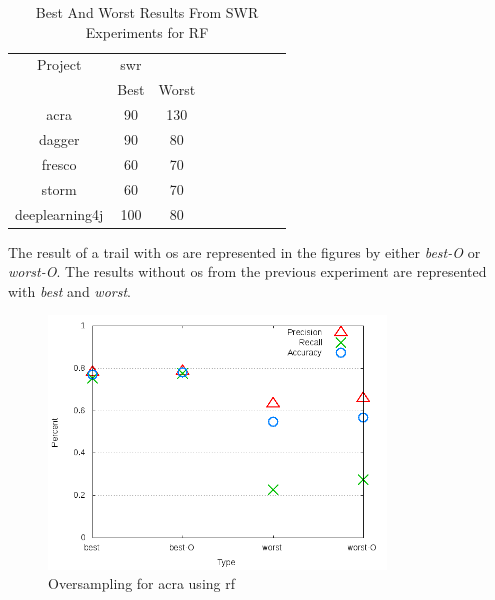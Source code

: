\begin{table}[ht]
\begin{center}

    \begin{tabular}{|c|c|c|c|c|c|c|c|c|}
        \hline
        Project & \multicolumn{1}{c}{\gls{swr}} & \\
         & \multicolumn{1}{c}{Best} & \multicolumn{1}{c|}{Worst} \\
         \hline
        acra & 90 & 130 \\
        dagger & 90 & 80 \\
        fresco & 60 & 70 \\
        storm & 60 & 70 \\
        deeplearning4j & 100 & 80 \\ \hline
    \end{tabular}
    \caption{Best And Worst Results From SWR Experiments for RF}
    \label{tab:rf_best_worst_swr_experiment_sets}
\end{center}
\end{table}

The result of a trail with \gls{os} are represented in the figures by either \textit{best-O} or \textit{worst-O}. The results without \gls{os} from the previous experiment are represented with \textit{best} and \textit{worst}.

\begin{figure}[!t]
    \centering

        \includegraphics[width=0.8\textwidth]{images/rf/test_4/acra_sample_range}
        \caption{Oversampling for acra using \gls{rf}}
        \label{fig:test_4_acra_rf}
\end{figure}

